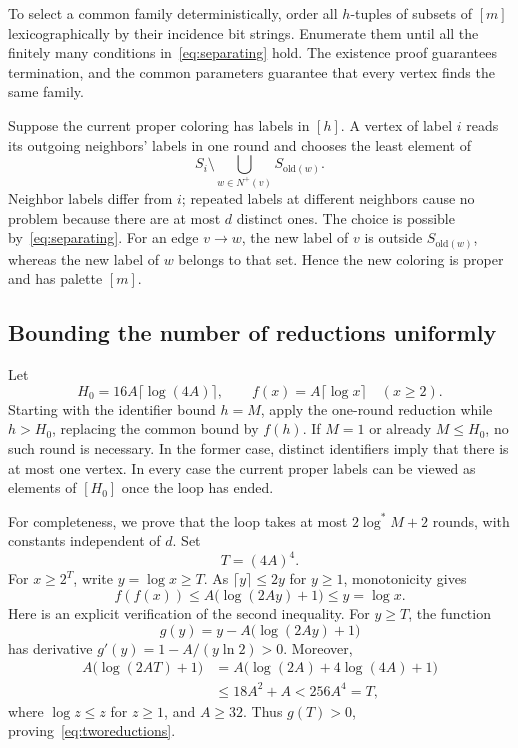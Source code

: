 \documentclass[11pt,a4paper]{article}
\numberwithin{equation}{section}
\newcommand{\Nout}{N^{+}}
\newcommand{\logstar}{\log^{*}}
\begin{document}
To select a common family deterministically, order all \(h\)-tuples
of subsets of \([m]\) lexicographically by their incidence bit
strings. Enumerate them until all the finitely many conditions
in~\eqref{eq:separating} hold. The existence proof guarantees
termination, and the common parameters guarantee that every vertex
finds the same family.

Suppose the current proper coloring has labels in \([h]\).
A vertex of label \(i\) reads its outgoing neighbors' labels in
one round and chooses the least element of
\begin{equation}
 S_i\setminus
 \bigcup_{w\in\Nout(v)}S_{\mathrm{old}(w)}.
 \label{eq:onestep}
\end{equation}
Neighbor labels differ from \(i\); repeated labels at different
neighbors cause no problem because there are at most \(d\) distinct
ones. The choice is possible by~\eqref{eq:separating}.
For an edge \(v\to w\), the new label of \(v\) is outside
\(S_{\mathrm{old}(w)}\), whereas the new label of \(w\) belongs to
that set. Hence the new coloring is proper and has palette \([m]\).

\subsection{Bounding the number of reductions uniformly}

Let
\begin{equation}
 H_0=16A\lceil\log(4A)\rceil,\qquad
 f(x)=A\lceil\log x\rceil\quad(x\geq2).
 \label{eq:threshold}
\end{equation}
Starting with the identifier bound \(h=M\), apply the one-round
reduction while \(h>H_0\), replacing the common bound by \(f(h)\).
If \(M=1\) or already \(M\leq H_0\), no such round is necessary.
In the former case, distinct identifiers imply that there is at most
one vertex. In every case the current proper labels can be viewed
as elements of \([H_0]\) once the loop has ended.

For completeness, we prove that the loop takes at most
\(2\logstar M+2\) rounds, with constants independent of \(d\).
Set
\[
 T=(4A)^4.
\]
For \(x\geq2^T\), write \(y=\log x\geq T\).
As \(\lceil y\rceil\leq2y\) for \(y\geq1\), monotonicity gives
\begin{equation}
 f(f(x))
 \leq A\bigl(\log(2Ay)+1\bigr)
 \leq y=\log x.
 \label{eq:tworeductions}
\end{equation}
Here is an explicit verification of the second inequality.
For \(y\geq T\), the function
\[
 g(y)=y-A\bigl(\log(2Ay)+1\bigr)
\]
has derivative \(g'(y)=1-A/(y\ln2)>0\).
Moreover,
\[
\begin{split}
 A\bigl(\log(2AT)+1\bigr)
 &=A\bigl(\log(2A)+4\log(4A)+1\bigr)\\
 &\leq18A^2+A
 <256A^4=T,
\end{split}
\]
where \(\log z\leq z\) for \(z\geq1\), and \(A\geq32\).
Thus \(g(T)>0\), proving~\eqref{eq:tworeductions}.
\end{document}
